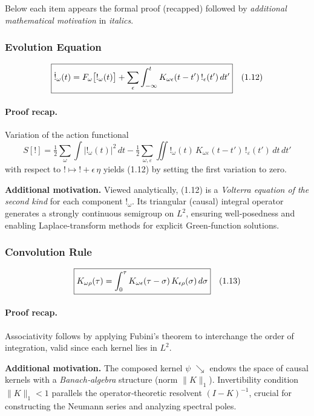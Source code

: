 \medskip
Below each item appears the formal proof (recapped) followed by \emph{additional mathematical motivation} in \textit{italics}.

\medskip
\subsubsection{Evolution Equation}
\[
  \boxed{%
  \dot{!}_{\omega}(t)
  = F_{\omega}\bigl[!_{\omega}(t)\bigr]
    + \sum_{\epsilon}
      \int_{-\infty}^{t}
        K_{\omega\epsilon}(t-t')\,!_{\epsilon}(t')\,dt'
  }\quad(1.12)
\]

\paragraph{Proof recap.}  
Variation of the action functional
\[
  S[!]
  = \tfrac12\sum_{\omega}\int |!_{\omega}(t)|^{2}\,dt
    - \tfrac12\sum_{\omega,\varepsilon}
      \iint !_{\omega}(t)\,K_{\omega\varepsilon}(t-t')\,!_{\varepsilon}(t')\,dt\,dt'
  \tag{1.15}
\]
with respect to \( ! \mapsto ! + \epsilon\,\eta\) yields (1.12) by setting the first variation to zero.

\begin{concept}
\textbf{Additional motivation.} Viewed analytically, (1.12) is a \emph{Volterra equation of the second kind} for each component \(!_{\omega}\).  Its triangular (causal) integral operator generates a strongly continuous semigroup on \(L^{2}\), ensuring well‐posedness and enabling Laplace‐transform methods for explicit Green‐function solutions.
\end{concept}

\medskip

\subsubsection{Convolution Rule}
\[
  \boxed{%
  K_{\omega\rho}(\tau)
  = \int_{0}^{\tau}
      K_{\omega\epsilon}(\tau-\sigma)\,K_{\epsilon\rho}(\sigma)\,d\sigma
  }\quad(1.13)
\]

\paragraph{Proof recap.}  
Associativity follows by applying Fubini’s theorem to interchange the order of integration, valid since each kernel lies in \(L^{2}\).

\begin{concept}
\textbf{Additional motivation.} The composed kernel \(\psi\) \(↘\) endows the space of causal kernels with a \emph{Banach‐algebra} structure (norm \(\|K\|_{1}\)).  Invertibility condition \(\|K\|_{1}<1\) parallels the operator‐theoretic resolvent \((I-K)^{-1}\), crucial for constructing the Neumann series and analyzing spectral poles.
\end{concept}

